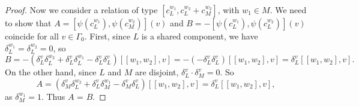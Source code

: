 \documentclass[10pt,a4paper]{amsart}
\begin{document}
\begin{proof}
 Now we consider a relation of type $[c_L^{w_1}, c_L^{w_2}+c_M^{w_2}]$, with $w_1 \in M$. We need to show that $A =[\psi(c_L^{w_1}), \psi(c_M^{w_2})](v)$
 and $B = -[\psi(c_L^{w_1}), \psi(c_L^{w_2})](v)$ coincide for all $v \in \Gamma_0$. First, since $L$ is a shared component, we have $\delta_L^{w_1} = \delta_L^{w_2} = 0$, so
 \[ B = -(\delta_L^v \delta_L^{w_2} + \delta_L^v \delta_L^{w_1} - \delta_L^v \delta_L^v)[[w_1,w_2],v] = -(-\delta_L^v \delta_L^v )[[w_1,w_2],v] = \delta_L^v[[w_1,w_2],v].\]
  On the other hand, since $L$ and $M$ are disjoint, $\delta_L^v \cdot \delta_M^v = 0$. So
\[ A = (\delta_M^v \delta_L^{w_2} + \delta_L^v \delta_M^{w_1} - \delta_M^v \delta_L^v)[[w_1,w_2],v] =\delta_L^v[[w_1,w_2],v],\]
as $\delta_M^{w_1} = 1$. Thus $A$ = $B$.
 \end{proof}
\end{document}
